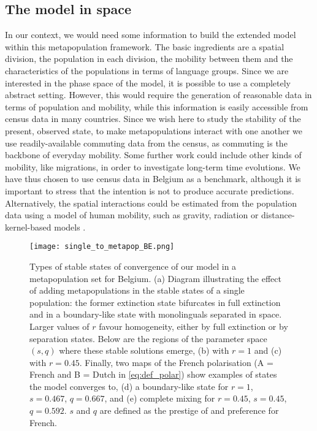\documentclass[../thesis.tex]{subfiles}
\begin{document}
\subsection{The model in space}
In our context, we would need some information to build the extended model within this
metapopulation framework. The basic ingredients are a spatial division, the population
in each division, the mobility between them and the characteristics of the populations
in terms of language groups. Since we are interested in the phase space of the model, it
is possible to use a completely abstract setting. However, this would require the
generation of reasonable data in terms of population and mobility, while this
information is easily accessible from census data in many countries. Since we wish here
to study the stability of the present, observed state, to make metapopulations interact
with one another we use readily-available commuting data from the census, as commuting
is the backbone of everyday mobility. Some further work could include other kinds of
mobility, like migrations, in order to investigate long-term time evolutions. We have
thus chosen to use census data in Belgium as a benchmark, although it is important to
stress that the intention is not to produce accurate predictions. Alternatively, the
spatial interactions could be estimated from the population data using a model of human
mobility, such as gravity, radiation or distance-kernel-based models
\cite{BarbosaHumanMobility2018,BurridgeSpatialEvolution2017,BurridgeInferringDrivers2021}.

\begin{figure}[hp!]
  \centering
  \texttt{[image: single\_to\_metapop\_BE.png]}
  \caption{Types of stable states of convergence of our model in a metapopulation set
  for Belgium. (a) Diagram illustrating the effect of adding metapopulations in the
  stable states of a single population: the former extinction state bifurcates in full
  extinction and in a boundary-like state with monolinguals separated in space. Larger
  values of $r$ favour homogeneity, either by full extinction or by separation states.
  Below are the regions of the parameter space $(s,q)$ where these stable solutions
  emerge, (b) with $r=1$ and (c) with $r=0.45$. Finally, two maps of the French
  polarisation (A = French and B = Dutch in \cref{eq:def_polar}) show examples of
  states the model converges to, (d) a boundary-like state for $r=1$, $s=0.467$,
  $q=0.667$, and (e) complete mixing for $r=0.45$, $s=0.45$, $q=0.592$. $s$ and $q$ are
  defined as the prestige of and preference for French.}
  \label{fig:single_to_metapop_BE}
\end{figure}
\end{document}
